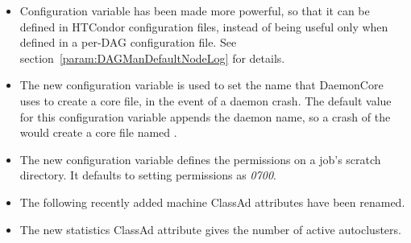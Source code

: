 \begin{itemize}

\item Configuration variable 
has been made more powerful,
so that it can be defined in HTCondor configuration files, 
instead of being useful only when defined in a per-DAG configuration file.
See section~\ref{param:DAGManDefaultNodeLog} for details.

\item The new configuration variable  is used to set
the name that DaemonCore uses to create a core file,
in the event of a daemon crash.
The default value for this configuration variable appends the daemon name,
so a crash of the  would create a core file named
.

\item The new configuration variable 
defines the permissions on a job's scratch directory. 
It defaults to setting permissions as \emph{0700}.

\item The following recently added machine ClassAd attributes have been renamed.

\item The new  statistics ClassAd attribute
 gives the number of active autoclusters.

\end{itemize}

